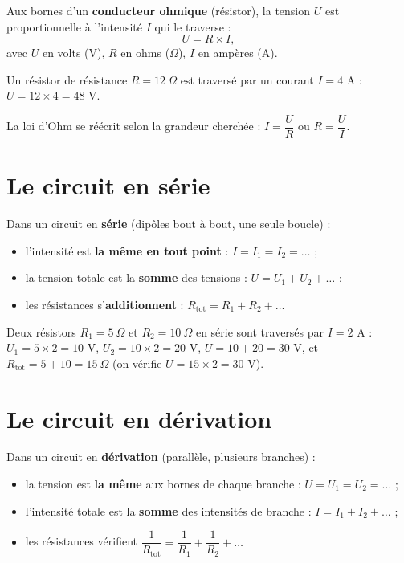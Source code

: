 \begin{propriete}
Aux bornes d'un \textbf{conducteur ohmique} (résistor), la tension $U$ est proportionnelle
à l'intensité $I$ qui le traverse :
\[
U=R\times I,
\]
avec $U$ en volts (V), $R$ en ohms ($\Omega$), $I$ en ampères (A).
\end{propriete}

\begin{exemple}
Un résistor de résistance $R=12\ \Omega$ est traversé par un courant $I=4$ A :
$U=12\times4=48$ V.
\end{exemple}

\begin{remarque}
La loi d'Ohm se réécrit selon la grandeur cherchée : $I=\dfrac UR$ ou $R=\dfrac UI$.
\end{remarque}

\section{Le circuit en série}

\begin{propriete}
Dans un circuit en \textbf{série} (dipôles bout à bout, une seule boucle) :
\begin{itemize}
\item l'intensité est \textbf{la même en tout point} : $I=I_1=I_2=\dots$ ;
\item la tension totale est la \textbf{somme} des tensions : $U=U_1+U_2+\dots$ ;
\item les résistances s'\textbf{additionnent} : $R_{\text{tot}}=R_1+R_2+\dots$
\end{itemize}
\end{propriete}

\begin{exemple}
Deux résistors $R_1=5\ \Omega$ et $R_2=10\ \Omega$ en série sont traversés par $I=2$ A :
$U_1=5\times2=10$ V, $U_2=10\times2=20$ V, $U=10+20=30$ V, et
$R_{\text{tot}}=5+10=15\ \Omega$ (on vérifie $U=15\times2=30$ V).
\end{exemple}

\section{Le circuit en dérivation}

\begin{propriete}
Dans un circuit en \textbf{dérivation} (parallèle, plusieurs branches) :
\begin{itemize}
\item la tension est \textbf{la même} aux bornes de chaque branche : $U=U_1=U_2=\dots$ ;
\item l'intensité totale est la \textbf{somme} des intensités de branche :
$I=I_1+I_2+\dots$ ;
\item les résistances vérifient $\dfrac1{R_{\text{tot}}}=\dfrac1{R_1}+\dfrac1{R_2}+\dots$
\end{itemize}
\end{propriete}


